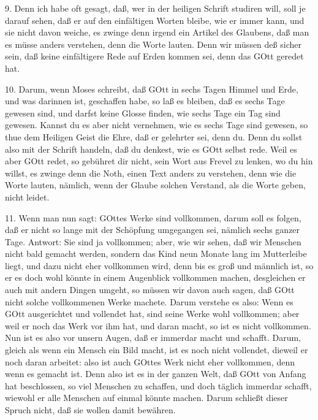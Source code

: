 9. Denn ich habe oft gesagt, daß, wer in der heiligen Schrift studiren will, soll je darauf sehen, daß er auf den einfältigen Worten bleibe, wie er immer kann, und sie nicht davon weiche, es zwinge denn irgend ein Artikel des Glaubens, daß man es müsse anders verstehen, denn die Worte lauten. Denn wir müssen deß sicher sein, daß keine einfältigere Rede auf Erden kommen sei, denn das GOtt geredet hat.

10. Darum, wenn Moses schreibt, daß GOtt in sechs Tagen Himmel und Erde, und was darinnen ist, geschaffen habe, so laß es bleiben, daß es sechs Tage gewesen sind, und darfst keine Glosse finden, wie sechs Tage ein Tag sind gewesen. Kannst du es aber nicht vernehmen, wie es sechs Tage sind gewesen, so thue dem Heiligen Geist die Ehre, daß er gelehrter sei, denn du. Denn du sollst also mit der Schrift handeln, daß du denkest, wie es GOtt selbst rede. Weil es aber GOtt redet, so gebühret dir nicht, sein Wort aus Frevel zu lenken, wo du hin willst, es zwinge denn die Noth, einen Text anders zu verstehen, denn wie die Worte lauten, nämlich, wenn der Glaube solchen Verstand, als die Worte geben, nicht leidet.

11. Wenn man nun sagt: GOttes Werke sind vollkommen, darum soll es folgen, daß er nicht so lange mit der Schöpfung umgegangen sei, nämlich sechs ganzer Tage. Antwort: Sie sind ja vollkommen; aber, wie wir sehen, daß wir Menschen nicht bald gemacht werden, sondern das Kind neun Monate lang im Mutterleibe liegt, und dazu nicht eher vollkommen wird, denn bis es groß und männlich ist, so er es doch wohl könnte in einem Augenblick vollkommen machen, desgleichen er auch mit andern Dingen umgeht, so müssen wir davon auch sagen, daß GOtt nicht solche vollkommenen Werke machete. Darum verstehe es also: Wenn es GOtt ausgerichtet und vollendet hat, sind seine Werke wohl vollkommen; aber weil er noch das Werk vor ihm hat, und daran macht, so ist es nicht vollkommen. Nun ist es also vor unsern Augen, daß er immerdar macht und schafft. Darum, gleich als wenn ein Mensch ein Bild macht, ist es noch nicht vollendet, dieweil er noch daran arbeitet: also ist auch GOttes Werk nicht eher vollkommen, denn wenn es gemacht ist. Denn also ist es in der ganzen Welt, daß GOtt von Anfang hat beschlossen, so viel Menschen zu schaffen, und doch täglich immerdar schafft, wiewohl er alle Menschen auf einmal könnte machen. Darum schließt dieser Spruch nicht, daß sie wollen damit bewähren.

